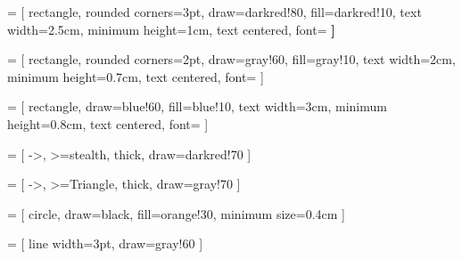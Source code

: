  = [
    rectangle,
    rounded corners=3pt,
    draw=darkred!80,
    fill=darkred!10,
    text width=2.5cm,
    minimum height=1cm,
    text centered,
    font=\small\bfseries
]

 = [
    rectangle,
    rounded corners=2pt,
    draw=gray!60,
    fill=gray!10,
    text width=2cm,
    minimum height=0.7cm,
    text centered,
    font=\footnotesize
]

 = [
    rectangle,
    draw=blue!60,
    fill=blue!10,
    text width=3cm,
    minimum height=0.8cm,
    text centered,
    font=\small\ttfamily
]

 = [
    ->,
    >=stealth,
    thick,
    draw=darkred!70
]

 = [
    ->,
    >=Triangle,
    thick,
    draw=gray!70
]

 = [
    circle,
    draw=black,
    fill=orange!30,
    minimum size=0.4cm
]

 = [
    line width=3pt,
    draw=gray!60
]


\newcommand{\filepath}[1]{\texttt{\color{codeblue}\small #1}}

\newcommand{\highlight}[1]{%
    \colorbox{yellow!30}{\texttt{#1}}%
}

\newenvironment{notebox}{%
    \begin{block}{Note}
}{%
    \end{block}
}

\newenvironment{warningbox}{%
    \begin{alertblock}{Warning}
}{%
    \end{alertblock}
}



\sloppy

\hfuzz=20pt
\vfuzz=20pt


